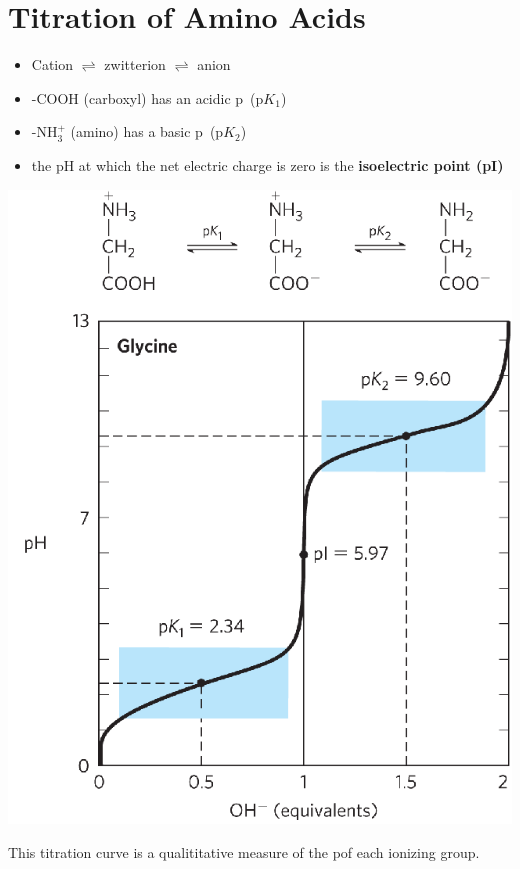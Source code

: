 \documentclass[10pt]{article}
\newcommand{\ka}{\text{$K_\text{a}$}}
\begin{document}
\section*{Titration of Amino Acids}
\begin{itemize}
    \item Cation $\rightleftharpoons$ zwitterion $\rightleftharpoons$ anion
    \item -COOH (carboxyl) has an acidic p\ka~(p$K_1$)
    \item -NH$_3^+$ (amino) has a basic p\ka~(p$K_2$)
    \item the pH at which the net electric charge is zero is the \textbf{isoelectric point (pI)}
\end{itemize}
\begin{center}
    \includegraphics*[scale=0.7]{L2_1.png}
\end{center}
This titration curve is a qualititative measure of the p\ka of each ionizing group.
\end{document}
